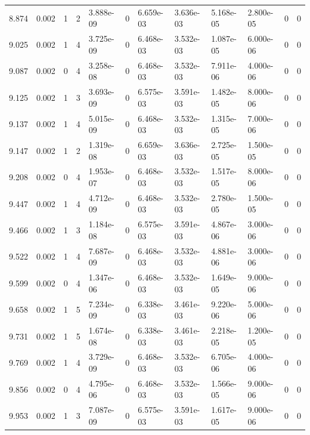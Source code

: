 \documentclass[preview]{standalone}
\begin{document}
{{{\begin{tabular}{L{1.2cm}C{1.2cm} C{0.3cm}C{0.5cm} C{1.4cm}C{1.4cm} C{1.4cm}C{1.4cm} C{1.6cm}C{1.6cm} C{1.6cm}C{1.6cm}}
  8.874  &  0.002  & 1     &  2 &  3.888e-09  & 0  &  6.659e-03&   3.636e-03& 5.168e-05 & 2.800e-05   &  0 & 0  \\ 
  9.025  &  0.002  & 1     &  4 &  3.725e-09  & 0  &  6.468e-03&   3.532e-03& 1.087e-05 & 6.000e-06   &  0 & 0  \\ 
  9.087  &  0.002  & 0     &  4 &  3.258e-08  & 0  &  6.468e-03&   3.532e-03& 7.911e-06 & 4.000e-06   &  0 & 0  \\ 
  9.125  &  0.002  & 1     &  3 &  3.693e-09  & 0  &  6.575e-03&   3.591e-03& 1.482e-05 & 8.000e-06   &  0 & 0  \\ 
  9.137  &  0.002  & 1     &  4 &  5.015e-09  & 0  &  6.468e-03&   3.532e-03& 1.315e-05 & 7.000e-06   &  0 & 0  \\ 
  9.147  &  0.002  & 1     &  2 &  1.319e-08  & 0  &  6.659e-03&   3.636e-03& 2.725e-05 & 1.500e-05   &  0 & 0  \\ 
  9.208  &  0.002  & 0     &  4 &  1.953e-07  & 0  &  6.468e-03&   3.532e-03& 1.517e-05 & 8.000e-06   &  0 & 0  \\ 
  9.447  &  0.002  & 1     &  4 &  4.712e-09  & 0  &  6.468e-03&   3.532e-03& 2.780e-05 & 1.500e-05   &  0 & 0  \\ 
  9.466  &  0.002  & 1     &  3 &  1.184e-08  & 0  &  6.575e-03&   3.591e-03& 4.867e-06 & 3.000e-06   &  0 & 0  \\ 
  9.522  &  0.002  & 1     &  4 &  7.687e-09  & 0  &  6.468e-03&   3.532e-03& 4.881e-06 & 3.000e-06   &  0 & 0  \\ 
  9.599  &  0.002  & 0     &  4 &  1.347e-06  & 0  &  6.468e-03&   3.532e-03& 1.649e-05 & 9.000e-06   &  0 & 0  \\ 
  9.658  &  0.002  & 1     &  5 &  7.234e-09  & 0  &  6.338e-03&   3.461e-03& 9.220e-06 & 5.000e-06   &  0 & 0  \\ 
  9.731  &  0.002  & 1     &  5 &  1.674e-08  & 0  &  6.338e-03&   3.461e-03& 2.218e-05 & 1.200e-05   &  0 & 0  \\ 
  9.769  &  0.002  & 1     &  4 &  3.729e-09  & 0  &  6.468e-03&   3.532e-03& 6.705e-06 & 4.000e-06   &  0 & 0  \\ 
  9.856  &  0.002  & 0     &  4 &  4.795e-06  & 0  &  6.468e-03&   3.532e-03& 1.566e-05 & 9.000e-06   &  0 & 0  \\ 
  9.953  &  0.002  & 1     &  3 &  7.087e-09  & 0  &  6.575e-03&   3.591e-03& 1.617e-05 & 9.000e-06   &  0 & 0  \\ 
\hline 
\end{tabular} 

}}}
\end{document}
